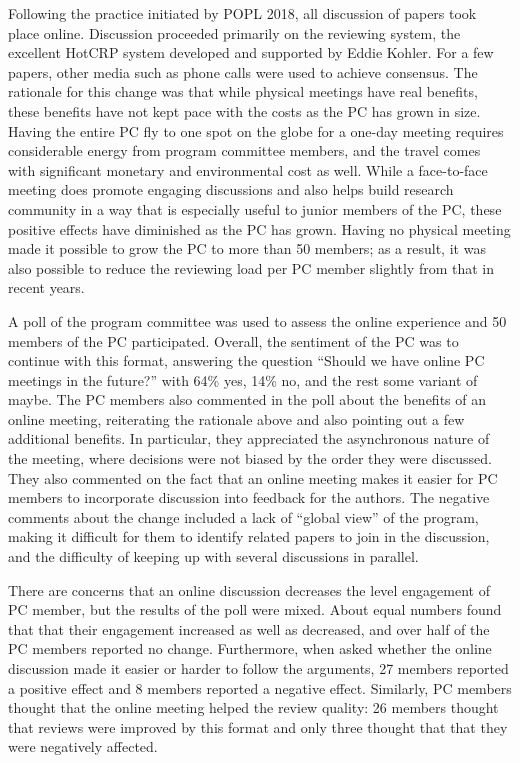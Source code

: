 Following the practice initiated by POPL 2018, all discussion of papers took
place online. Discussion proceeded primarily on the reviewing system, the
excellent HotCRP system developed and supported by Eddie Kohler.  For a few
papers, other media such as phone calls were used to achieve consensus. The
rationale for this change was that while physical meetings have real benefits,
these benefits have not kept pace with the costs as the PC has grown in size.
Having the entire PC fly to one spot on the globe for a one-day meeting
requires considerable energy from program committee members, and the
travel comes with significant monetary and environmental cost as well. While a
face-to-face meeting does promote engaging discussions and also helps build
research community in a way that is especially useful to junior members of the
PC, these positive effects have diminished as the PC has grown. Having no
physical meeting made it possible to grow the PC to more than 50 members; as a
result, it was also possible to reduce the reviewing load per PC member
slightly from that in recent years.

A poll of the program committee was used to assess the online experience and
50 members of the PC participated. 
%
Overall, the sentiment of the PC was to continue with this format, answering
the question ``Should we have online PC meetings in the future?'' with 64\%
yes, 14\% no, and the rest some variant of maybe.  The PC members also
commented in the poll about the benefits of an online meeting, reiterating the
rationale above and also pointing out a few additional benefits. In
particular, they appreciated the asynchronous nature of the meeting, where
decisions were not biased by the order they were discussed. They also commented on
the fact that an online meeting makes it easier for PC members to
incorporate discussion into feedback for the authors.  The negative comments
about the change included a lack of ``global view'' of the program, making it
difficult for them to identify related papers to join in the discussion, and
the difficulty of keeping up with several discussions in parallel. 

There are concerns that an online discussion decreases the level engagement of
PC member, but the results of the poll were mixed. About equal numbers found
that that their engagement increased as well as decreased, and over half of
the PC members reported no change. Furthermore, when asked whether the online
discussion made it easier or harder to follow the arguments, 27 members
reported a positive effect and 8 members reported a negative effect.
Similarly, PC members thought that the online meeting helped the review
quality: 26 members thought that reviews were improved by this format and
only three thought that that they were negatively affected. 

